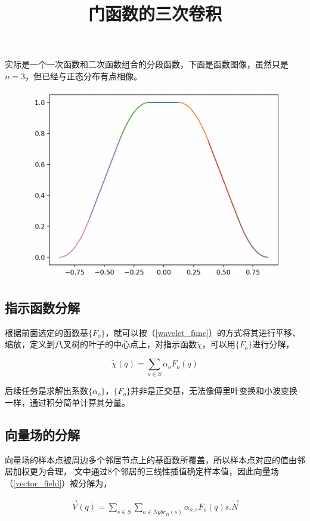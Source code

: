 			实际是一个一次函数和二次函数组合的分段函数，下面是函数图像，虽然只是$n=3$，但已经与正态分布有点相像。

			\begin{figure}[H]
				\begin{center}
					\includegraphics[scale=0.8]{images/p_2.png}
					\title{门函数的三次卷积}
				\end{center}
			\end{figure}

	\subsection{指示函数分解}
		根据前面选定的函数基$\{F_o\}$，就可以按（\ref{wavelet_func}）的方式将其进行平移、缩放，定义到八叉树的叶子的中心点上，对指示函数$\tilde{\chi}$，可以用$\{F_o\}$进行分解，

		$$
			\tilde{\chi}(q) = \sum_{o \in S} \alpha_{o} F_o(q)
		$$

		后续任务是求解出系数$\{\alpha_{o}\}$，$\{F_o\}$并非是正交基，无法像傅里叶变换和小波变换一样，通过积分简单计算其分量。

	\subsection{向量场的分解}

		向量场的样本点被周边多个邻居节点上的基函数所覆盖，所以样本点对应的值由邻居加权更为合理， 文中通过8个邻居的三线性插值确定样本值，因此向量场（\ref{vector_field}）被分解为，

		\begin{align}
			\overrightarrow{V}(q) = \sum_{s \in S}\sum_{o \in {Ngbr}_D(s)} \alpha_{o,s}F_o(q)s.\overrightarrow{N}
		\end{align}

